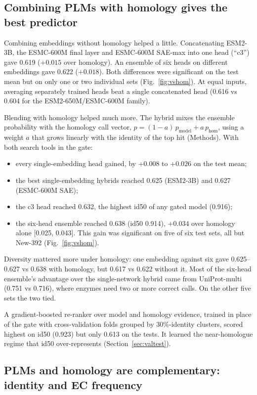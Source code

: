 \documentclass[11pt]{article}
\begin{document}
\subsection{Combining PLMs with homology gives the best predictor}

Combining embeddings without homology helped a little. Concatenating ESM2-3B, the ESMC-600M final layer and
ESMC-600M SAE-max into one head (``c3'') gave 0.619 ($+0.015$ over homology). An ensemble of six heads on different
embeddings gave 0.622 ($+0.018$). Both differences were significant on the test mean but on only one or two individual
sets (Fig.~\ref{fig:vshom}). At equal inputs, averaging separately trained heads beat a single concatenated head
(0.616 vs 0.604 for the ESM2-650M/ESMC-600M family).

Blending with homology helped much more. The hybrid mixes the ensemble probability with the homology call vector,
$p = (1-a)\,p_\text{model} + a\,p_\text{hom}$, using a weight $a$ that grows linearly with the identity of the top hit
(Methods). With both search tools in the gate:
\begin{itemize}
  \item every single-embedding head gained, by $+0.008$ to $+0.026$ on the test mean;
  \item the best single-embedding hybrids reached 0.625 (ESM2-3B) and 0.627 (ESMC-600M SAE);
  \item the c3 head reached 0.632, the highest id50 of any gated model (0.916);
  \item the six-head ensemble reached 0.638 (id50 0.914), $+0.034$ over homology alone [0.025, 0.043]. This gain was
        significant on five of six test sets, all but New-392 (Fig.~\ref{fig:vshom}).
\end{itemize}
Diversity mattered more under homology: one embedding against six gave 0.625--0.627 vs 0.638 with homology, but
0.617 vs 0.622 without it. Most of the six-head ensemble's advantage over the single-network hybrid came from
UniProt-multi (0.751 vs 0.716), where enzymes need two or more correct calls. On the other five sets the two tied.

A gradient-boosted re-ranker \cite{sklearn} over model and homology evidence, trained in place of the gate with
cross-validation folds grouped by 30\%-identity clusters, scored highest on id50 (0.923) but only 0.613 on the tests. It
learned the near-homologue regime that id50 over-represents (Section~\ref{sec:valtest}).

\subsection{PLMs and homology are complementary: identity and EC frequency}
\end{document}
